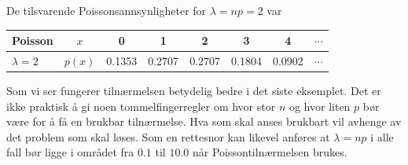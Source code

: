 \noindent De tilsvarende Poissonsannsynligheter for $\lambda =np=2$ var

\begin{center} \small
\begin{tabular}{lc|cccccc}
 Poisson   & $x$  &  0  &  1   &   2  &  3  &  4  &  $\cdots$  \\ \hline
 $\lambda=2$ & $p(x)$&0.1353&0.2707&0.2707&0.1804&0.0902&$\cdots$
\end{tabular}
\end{center}

\noindent Som vi ser fungerer tilnærmelsen betydelig bedre i det siste
eksemplet. Det er ikke praktisk å gi noen tommelfingerregler om
hvor stor $n$ og hvor liten $p$ bør være for å få en brukbar
tilnærmelse. Hva som skal anses brukbart vil avhenge av det
problem som skal løses. Som en rettesnor kan likevel anføres at
$\lambda =np$ i alle fall bør ligge i området fra $0.1$ til
$10.0$ når Poissontilnærmelsen brukes.\\

